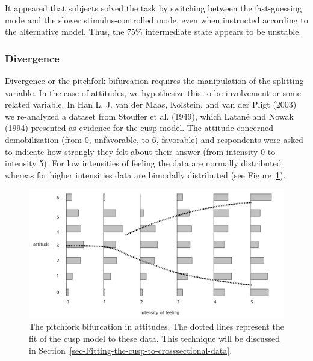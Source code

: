\documentclass[
  a4paper,
  DIV=11,
  numbers=noendperiod,
  oneside]{scrreprt}
\begin{document}
It appeared that subjects solved the task by switching between the
fast-guessing mode and the slower stimulus-controlled mode, even when
instructed according to the alternative model. Thus, the 75\%
intermediate state appears to be unstable.

\hypertarget{sec-Divergence}{%
\subsubsection{Divergence}\label{sec-Divergence}}

Divergence or the pitchfork bifurcation requires the manipulation of the
splitting variable. In the case of attitudes, we hypothesize this to be
involvement or some related variable. In Han L. J. van der Maas,
Kolstein, and van der Pligt (2003) we re-analyzed a dataset from
Stouffer et al. (1949), which Latané and Nowak (1994) presented as
evidence for the cusp model. The attitude concerned demobilization (from
0, unfavorable, to 6, favorable) and respondents were asked to indicate
how strongly they felt about their answer (from intensity 0 to intensity
5). For low intensities of feeling the data are normally distributed
whereas for higher intensities data are bimodally distributed (see
Figure~\ref{fig-ch3-img21-old-33}).

\begin{figure}

{\centering \includegraphics{media/ch3/ch3-21__figure33.png}

}

\caption{\label{fig-ch3-img21-old-33}The pitchfork bifurcation in
attitudes. The dotted lines represent the fit of the cusp model to these
data. This technique will be discussed in
Section~\ref{sec-Fitting-the-cusp-to-crosssectional-data}.}

\end{figure}
\end{document}
